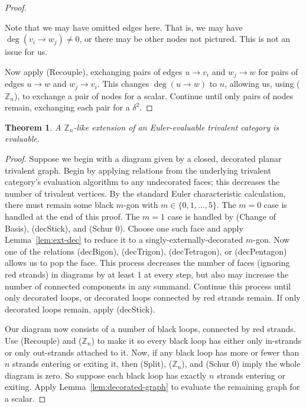 \documentclass[pdflatex,sn-mathphys-num]{sn-jnl}%
\theoremstyle{thmstyleone}%
\newtheorem{theorem}{Theorem}
\theoremstyle{thmstyletwo}%
\theoremstyle{thmstylethree}%
\newcommand{\Z}{\mathbb{Z}}
\begin{document}
\begin{proof}
\begin{center}
    \end{center}
    Note that we may have omitted edges here.
    That is, we may have $\deg(v_i \to w_j) \neq 0$, or there may be other nodes not pictured.
    This is not an issue for us.

    Now apply (Recouple), exchanging pairs of edges $u\to v_i$ and $w_j \to w$ for pairs of edges $u\to w$ and $w_j\to v_i$.
    This changes $\deg(u\to w)$ to $n$, allowing us, using ($\Z_n$), to exchange a pair of nodes for a scalar.
    Continue until only pairs of nodes remain, exchanging each pair for a $\delta^2$.
\end{proof}







\begin{theorem}\label{thm:eval-criteria}
    A $\Z_n$-like extension of an Euler-evaluable trivalent category is evaluable.
\end{theorem}

\begin{proof}
    Suppose we begin with a diagram given by a closed, decorated planar trivalent graph.
    Begin by applying relations from the underlying trivalent category's evaluation algorithm to any undecorated faces; 
    this decreases the number of trivalent vertices.
    By the standard Euler characteristic calculation, there must remain some black $m$-gon with $m\in\{ 0,1,\dots,5 \}$.
    The $m=0$ case is handled at the end of this proof.
    The $m=1$ case is handled by (Change of Basis), (decStick), and (Schur 0). 
    Choose one such face and apply Lemma~\ref{lem:ext-dec} to reduce it to a singly-externally-decorated $m$-gon.
    Now one of the relations (decBigon), (decTrigon), (decTetragon), or (decPentagon) allows us to pop the face.
    This process decreases the number of faces (ignoring red strands) in diagrams by at least 1 at every step,
    but also may increase the number of connected components in any summand.
    Continue this process until only decorated loops, or decorated loops connected by red strands remain.
    If only decorated loops remain, apply (decStick).
    
    Our diagram now consists of a number of black loops, connected by red strands.
    Use (Recouple) and ($\Z_n$) to make it so every black loop has either only in-strands or only out-strands attached to it.
    Now, if any black loop has more or fewer than $n$ strands entering or exiting it,
    then (Split), ($\Z_n$), and (Schur 0) imply the whole diagram is zero.
    So suppose each black loop has exactly $n$ strands entering or exiting.
    Apply Lemma~\ref{lem:decorated-graph} to evaluate the remaining graph for a scalar.
\end{proof}
\end{document}
